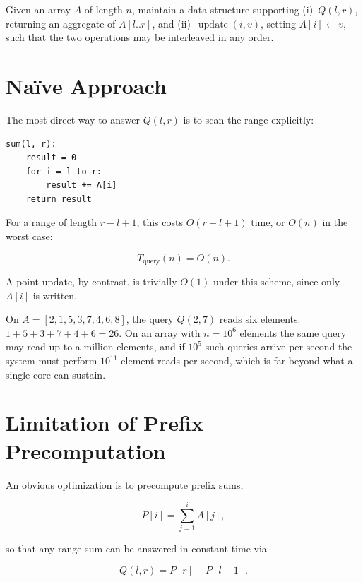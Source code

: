 \begin{defn}
Given an array $A$ of length $n$, maintain a data structure supporting (i)~$Q(l,r)$, returning an aggregate of $A[l..r]$, and (ii)~$\operatorname{update}(i,v)$, setting $A[i]\leftarrow v$, such that the two operations may be interleaved in any order.
\end{defn}

\section{Na\"ive Approach}
The most direct way to answer $Q(l,r)$ is to scan the range explicitly:

\begin{lstlisting}
sum(l, r):
    result = 0
    for i = l to r:
        result += A[i]
    return result
\end{lstlisting}

For a range of length $r-l+1$, this costs $O(r-l+1)$ time, or $O(n)$ in the worst case:

\begin{equation}
T_{\text{query}}(n) = O(n).
\end{equation}

A point update, by contrast, is trivially $O(1)$ under this scheme, since only $A[i]$ is written.

\begin{exmp}
On $A=[2,1,5,3,7,4,6,8]$, the query $Q(2,7)$ reads six elements: $1+5+3+7+4+6=26$. On an array with $n=10^6$ elements the same query may read up to a million elements, and if $10^5$ such queries arrive per second the system must perform $10^{11}$ element reads per second, which is far beyond what a single core can sustain.
\end{exmp}

\section{Limitation of Prefix Precomputation}
An obvious optimization is to precompute prefix sums,

\begin{equation}
P[i] = \sum_{j=1}^{i} A[j],
\end{equation}

so that any range sum can be answered in constant time via

\begin{equation}
Q(l,r) = P[r] - P[l-1].
\end{equation}


